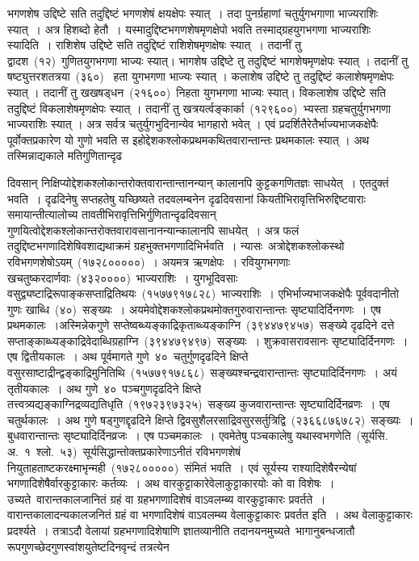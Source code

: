 \documentclass[11pt, openany]{book}
\begin{document}
\indent
भगणशेष उद्दिष्टे सति तदुद्दिष्टं भगणशेषं क्षयक्षेपः स्यात्~। तदा पुनर्ग्रहाणां चतुर्युगभगाणा भाज्यराशिः स्यात्~। अत्र हिशब्दो हेतौ~। यस्मादुद्दिष्टभगणशेषमृणक्षेपो भवति तस्माद्ग्रहयुगभगणा भाज्यराशिः स्यादिति~। राशिशेष उद्दिष्टे सति तदुद्दिष्टं राशिशेषमृणक्षेषः स्यात्~। तदानीं तु द्वादश~(१२)~गुणितयुगभगणा भाज्यः स्यात्। भागशेष उद्दिष्टे तु तदुद्दिष्टं भागशेषमृणक्षेपः स्यात् । तदानीं तु षष्ट्युत्तरशतत्रया~(३६०)~ हता युगभगणा भाज्यः स्यात् । कलाशेष उद्दिष्टे तु तदुद्दिष्टं कलाशेषमृणक्षेपः स्यात् । तदानीं तु खखषड्धन~(२१६००)~निहता युगभगणा भाज्यः स्यात्। विकलाशेष उद्दिष्टे सति तदुद्दिष्टं विकलाशेषमृणक्षेपः स्यात् । तदानीं तु खत्रयर्त्वङ्कार्का~(१२९६००)~भ्यस्ता ग्रहचतुर्युगभगणा  भाज्यराशिः स्यात् । अत्र सर्वत्र चतुर्युगभुदिनान्येव भागहारो भवेत् । एवं प्रदर्शितैरेतैर्भाज्यभाजकक्षेपैः पूर्वोक्तप्रकारेण यो गुणो भवति स इहोद्देशकश्लोकप्रथमकथितवारान्तान्तः प्रथमकालः स्यात् । अथ तस्मिन्नाद्यकाले मतिगुणितान्दृढ\textendash

\newpage
\thispagestyle{fancy}
\fancyhf{}
\noindent
दिवसान् निक्षिप्योद्देशकश्लोकान्तरोक्तवारान्तान्तानन्यान् कालानपि
कुट्टकगणितज्ञः साधयेत्~। एतदुक्तं भवति~। दृढदिनेषु सप्तहतेषु यच्छिष्यते तदवलम्बनेन दृढदिवसानां कियतीभिरावृत्तिभिरुद्दिष्टवाराः समायान्तीत्यालोच्य
तावतीभिरावृत्तिभिर्गुणितान्दृढदिवसान् गुणयित्वोद्देशकश्लोकान्तरोक्तवारावसानानन्यान्कालानपि साधयेत्~। 
अत्र फलं तदुद्दिष्टभगणादिशेषिवशाद्यथाक्रमं ग्रहभुक्तभगणादिभिर्भवति~।  न्यासः\textendash\ अत्रोद्देशकश्लोकस्थो रविभगणशेषोऽयम्~(१७२८०००००)~। अयमत्र ऋणक्षेपः~। रवियुगभगणाः खचतुष्करदार्णवाः~(४३२००००)~भाज्यराशिः~। युगभूदिवसाः वसुद्व्यष्टाद्रिरूपाङ्कसप्ताद्रितिथयः~(१५७७९१७८२८)~भाज्यराशिः~।  एभिर्भाज्यभाजकक्षेपैः पूर्ववदानीतो गुणः खाब्धि~(४०)~सङ्ख्यः~। अयमेवोद्देशकश्लोकप्रथमोक्तगुरुवारान्तान्तः सृष्ट्यादिर्दिनगणः~। एष प्रथमकालः~।अस्मिन्नेकगुणे सप्तेष्वब्ध्यङ्काद्रिकृताब्ध्यङ्काग्नि~(३९४४७९४५७)~सङ्ख्ये दृढदिने दत्ते सप्ताङ्काब्ध्यङ्काद्रिवेदाब्धिग्रहाग्नि~(३९४४७९४९७)~सङ्ख्यः~। शुक्रवासरावसानः सृष्ट्यादिर्दिनगणः~। एष द्वितीयकालः~। अथ पूर्वमागते गुणे~४०~चतुर्गुणदृढदिने क्षिप्ते वसुरसाष्टाद्रीन्द्वङ्काद्रिमुनितिथि~(१५७७९१७८६८)~सङ्ख्यश्चन्द्रवारान्तान्तः सृष्ट्यादिर्दिनगणः~। अयं तृतीयकालः~। अथ गुणे~४०~पञ्चगुणदृढदिने क्षिप्ते
तत्त्वत्र्यद्यङ्काग्निद्रव्यद्यतिधृति~(१९७२३९७३२५)~सङ्ख्य कुजवारान्तान्तः सृष्ट्यादिर्दिनव्रणः~। एष चतुर्थकालः~। अथ गुणे षड्गुणद्दृढदिने क्षिप्ते द्विवसुशैलरसाद्रिवसुरसर्तुत्रिद्वि~(२३६६८७६७८२)~सङ्ख्यः~। बुधवारान्तान्तः सृष्ट्यादिर्दिनव्रजः~। एष पञ्चमकालः~। एवमेतेषु पञ्चकालेषु यथास्वभगणेति~(सूर्यसि. अ.~१~श्लो.~५३)~सूर्यसिद्धान्तोक्तप्रकारेणाऽनीतं रविभगणशेषं नियुताहताष्टकरक्ष्माभृन्मही~(१७२८०००००)~संमितं भवति~। एवं सूर्यस्य राश्यादिशेषैरन्येषां भगणादिशेषैर्वारकुट्टाकारः कर्तव्यः~। अथ वारकुट्टाकारेवेलाकुट्टाकारयोः को वा विशेषः~। उच्यते\textendash\ वारान्तकालजानितं ग्रहं वा ग्रहभगणादिशेषं वाऽवलम्ब्य वारकुट्टाकारः प्रवर्तते~। वारान्तकालादन्यकालजनितं ग्रहं वा भगणादिशेषं वाऽवलम्ब्य वेलाकुट्टाकारः प्रवर्तत इति~। अथ वेलाकुट्टाकारः प्रदर्श्यते~। तत्राऽदौ वेलायां ग्रहभगणादिशेषाणि ज्ञातव्यानीति तदानयनमुच्यते\textendash\ भागानुबन्धजातौ रूपगुणच्छेदगुणस्वांशयुतेष्टदिनवृन्दं तत्रत्येन
\end{document}
